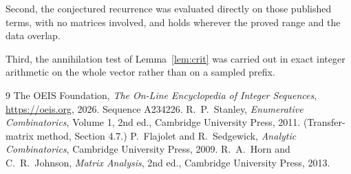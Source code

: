 \documentclass[11pt,a4paper]{article}
\theoremstyle{plain}
\theoremstyle{definition}
\begin{document}
Second, the conjectured recurrence was evaluated directly on those published terms, with no
matrices involved, and holds wherever the proved range and the data overlap.

Third, the annihilation test of Lemma~\ref{lem:crit} was carried out in exact integer
arithmetic on the whole vector rather than on a sampled prefix.

\begin{thebibliography}{9}
 The OEIS Foundation, \emph{The On-Line Encyclopedia of Integer
Sequences}, \url{https://oeis.org}, 2026. Sequence A234226.
 R.~P.~Stanley, \emph{Enumerative Combinatorics}, Volume 1, 2nd ed.,
Cambridge University Press, 2011. (Transfer-matrix method, Section 4.7.)
 P.~Flajolet and R.~Sedgewick, \emph{Analytic Combinatorics}, Cambridge
University Press, 2009.
 R.~A.~Horn and C.~R.~Johnson, \emph{Matrix Analysis}, 2nd ed., Cambridge
University Press, 2013.
\end{thebibliography}
\end{document}
